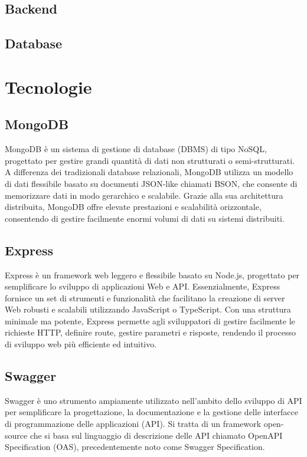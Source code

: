 \documentclass[12pt,a4paper,openright,twoside]{book}
\begin{document}
\section{Backend}

\section{Database}


\chapter{Tecnologie}

\section{MongoDB}

MongoDB è un sistema di gestione di database (DBMS) di tipo NoSQL, progettato per gestire grandi quantità di dati non strutturati o semi-strutturati. A differenza dei tradizionali database relazionali, MongoDB utilizza un modello di dati flessibile basato su documenti JSON-like chiamati BSON, che consente di memorizzare dati in modo gerarchico e scalabile. Grazie alla sua architettura distribuita, MongoDB offre elevate prestazioni e scalabilità orizzontale, consentendo di gestire facilmente enormi volumi di dati su sistemi distribuiti.

\section{Express}

Express è un framework web leggero e flessibile basato su Node.js, progettato per semplificare lo sviluppo di applicazioni Web e API. Essenzialmente, Express fornisce un set di strumenti e funzionalità che facilitano la creazione di server Web robusti e scalabili utilizzando JavaScript o TypeScript. Con una struttura minimale ma potente, Express permette agli sviluppatori di gestire facilmente le richieste HTTP, definire route, gestire parametri e risposte, rendendo il processo di sviluppo web più efficiente ed intuitivo.

\section{Swagger}

Swagger è uno strumento ampiamente utilizzato nell'ambito dello sviluppo di API per semplificare la progettazione, la documentazione e la gestione delle interfacce di programmazione delle applicazioni (API). Si tratta di un framework open-source che si basa sul linguaggio di descrizione delle API chiamato OpenAPI Specification (OAS), precedentemente noto come Swagger Specification.
\end{document}
